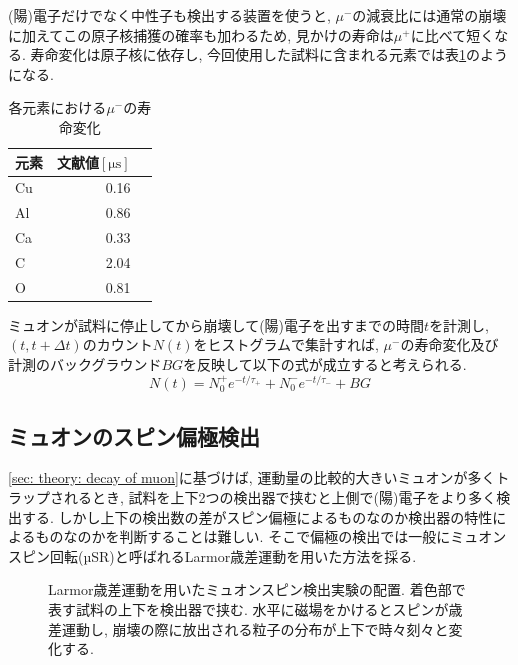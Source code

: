 \documentclass[dvipdfmx]{jsarticle}
\begin{document}
(陽)電子だけでなく中性子も検出する装置を使うと, $\mu^-$の減衰比には通常の崩壊に加えてこの原子核捕獲の確率も加わるため, 見かけの寿命は$\mu^+$に比べて短くなる.
寿命変化は原子核に依存し, 今回使用した試料に含まれる元素では表\ref{table: theory: life of muon}のようになる\cite{Ito Kaji Tabata Yoshiwara}.

\begin{table}
    \centering
    \caption{各元素における$\mu^-$の寿命変化}
    \begin{tabular}{lrr}
        \toprule
        元素 & 文献値$[\unit{\micro\second}]$
        \\
        \midrule
        Cu & 0.16
        \\
        Al & 0.86
        \\
        Ca & 0.33
        \\
        C & 2.04
        \\
        O & 0.81
        \\
        \bottomrule
    \end{tabular}
    \label{table: theory: life of muon}
\end{table}


ミュオンが試料に停止してから崩壊して(陽)電子を出すまでの時間$t$を計測し, $(t,t+\Delta t)$のカウント$N(t)$をヒストグラムで集計すれば, $\mu^-$の寿命変化及び計測のバックグラウンド$BG$を反映して以下の式が成立すると考えられる.
\begin{equation}
    \label{eq: N of t considering different tau and BG}
    N(t)
    =
    N_0^+e^{-t/\tau_+}
    +
    N_0^-e^{-t/\tau_-}
    +
    BG
\end{equation}


\subsection{ミュオンのスピン偏極検出}

\ref{sec: theory: decay of muon}に基づけば, 運動量の比較的大きいミュオンが多くトラップされるとき, 試料を上下2つの検出器で挟むと上側で(陽)電子をより多く検出する.
しかし上下の検出数の差がスピン偏極によるものなのか検出器の特性によるものなのかを判断することは難しい.
そこで偏極の検出では一般にミュオンスピン回転(µSR)と呼ばれるLarmor歳差運動を用いた方法を採る.

\begin{figure}[b]
    \centering
    
    \caption{Larmor歳差運動を用いたミュオンスピン検出実験の配置. 着色部で表す試料の上下を検出器で挟む. 水平に磁場をかけるとスピンが歳差運動し, 崩壊の際に放出される粒子の分布が上下で時々刻々と変化する. }
    \label{fig: Larmor spin}
\end{figure}
\end{document}

